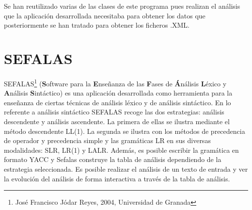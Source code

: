 Se han reutilizado varias de las clases de este programa pues realizan el análisis que la aplicación desarrollada necesitaba para obtener los datos que posteriormente se han tratado para obtener los ficheros .XML.


\section{SEFALAS\cite{SEFALAS}}
SEFALAS\footnote{José Francisco Jódar Reyes, 2004, Universidad de Granada} (\textbf{S}oftware para la \textbf{E}nseñanza de las \textbf{F}ases de \textbf{Á}nálisis \textbf{L}éxico y \textbf{A}nálisis \textbf{S}intáctico) es una aplicación desarrollada como herramienta para la enseñanza de ciertas técnicas de análisis léxico y de análisis sintáctico. En lo referente a análisis sintáctico SEFALAS recoge las dos estrategias: análisis descendente y análisis ascendente. La primera de ellas se ilustra mediante el método descendente LL(1). La segunda se ilustra con los métodos de precedencia de operador y precedencia simple y las gramáticas LR en sus diversas modalidades: SLR, LR(1) y LALR. Además, es posible escribir la gramática en formato YACC y Sefalas construye la tabla de análisis dependiendo de la estrategia seleccionada. Es posible realizar el análisis de un texto de entrada y ver la evolución del análisis de forma interactiva a través de la tabla de análisis.
